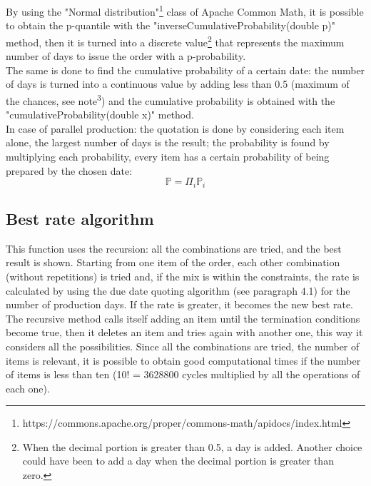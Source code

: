\documentclass[a4paper,12pt]{article}
\begin{document}
By using the "Normal distribution"\footnote{https://commons.apache.org/proper/commons-math/apidocs/index.html} class of Apache Common Math, it is possible to obtain the p-quantile with the "inverseCumulativeProbability(double p)" method, then it is turned into a discrete value\footnote{When the decimal portion is greater than 0.5, a day is added. Another choice could have been to add a day when the decimal portion is greater than zero.} that represents the maximum number of days to issue the order with a p-probability. \\
The same is done to find the cumulative probability of a certain date: the number of days is turned into a continuous value by adding less than 0.5 (maximum of the chances, see note\textsuperscript{3}) and the cumulative probability is obtained with the "cumulativeProbability(double x)" method. \\
In case of parallel production: the quotation is done by considering each item alone, the largest number of days is the result; the probability is found by multiplying each probability, every item has a certain probability of being prepared by the chosen date:
\begin{equation*}
\mathbb{P} = \Pi_{i} \mathbb{P}_{i}
\end{equation*}

\subsection{Best rate algorithm}
This function uses the recursion: all the combinations are tried, and the best result is shown. Starting from one item of the order, each other combination (without repetitions) is tried and, if the mix is within the constraints, the rate is calculated by using the due date quoting algorithm (see paragraph 4.1) for the number of production days. If the rate is greater, it becomes the new best rate. The recursive method calls itself adding an item until the termination conditions become true, then it deletes an item and tries again with another one, this way it considers all the possibilities. Since all the combinations are tried, the number of items is relevant, it is possible to obtain good computational times if the number of items is less than ten (10! =  3628800 cycles multiplied by all the operations of each one). \\
\end{document}
